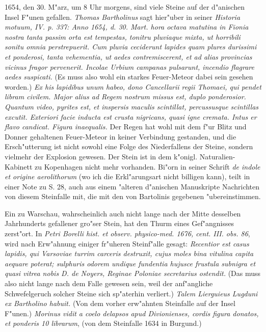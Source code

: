\documentclass[a4paper, 11pt, oneside, polutonikogreek, german]{article}
\begin{document}
1654, den 30. M"arz, um 8 Uhr morgens, sind viele Steine auf der d"anischen Insel F"unen gefallen. \emph{Thomas Bartholinus} sagt hier"uber in seiner \emph{Historia motuum, IV. p. 337: Anno 1654, d. 30. Mart. hora octava matutina in Fionia nostra tanta passim orta est tempestas, tonitru pluviaque mixta, ut horribili sonitu omnia perstrepuerit. Cum pluvia ceciderunt lapides quam plures durissimi et ponderosi, tanta vehementia, ut aedes contremiscerent, et ad alias provincias vicinus fragor pervenerit. Incolae Urbium campanas pulsarunt, incendio flagrare aedes suspicati.} (Es muss also wohl ein starkes Feuer-Meteor dabei sein gesehen worden.) \emph{Ex his lapidibus unum habeo, dono Cancellarii regii Thomaei, qui pendet libram civilem. Major alius ad Regem nostrum missus est, duplo ponderosior. Quantum video, pyrites est, et inspersis maculis scintillat, percussusque scintillas excutit. Exteriori facie inducta est crusta nigricans, quasi igne cremata. Intus er flavo candicat. Figura inaequalis.} Der Regen hat wohl mit dem f"ur Blitz und Donner gehaltenen Feuer-Meteor in keiner Verbindung gestanden, und die Ersch"utterung ist nicht sowohl eine Folge des Niederfallens der Steine, sondern vielmehr der Explosion gewesen. Der Stein ist in dem k"onigl. Naturalien-Kabinett zu Kopenhagen nicht mehr vorhanden. Bi"orn in seiner Schrift \emph{de indole et origine aerolithorum} (wo ich die Erkl"arungsart nicht billigen kann), teilt in einer Note zu S. 28, auch aus einem "alteren d"anischen Manuskripte Nachrichten von diesem Steinfalle mit, die mit den von Bartolinis gegebenen "ubereinstimmen.

Ein zu Warschau, wahrscheinlich auch nicht lange nach der Mitte desselben Jahrhunderts gefallener gro"ser Stein, hat den Thurm eines Gef"angnisses zerst"ort. In \emph{Petri Borelli hist. et observ. physico-med. 1676, cent. III. obs. 86}, wird nach Erw"ahnung einiger fr"uheren Steinf"alle gesagt: \emph{Recentior est casus lapidis, qui Varsoviae turrim carceris destruxit, cujus moles bina vitulina capita aequare poterat; sulphuris odorem undique fundentia hujusce frustula subnigra et quasi vitrea nobis D. de Noyers, Reginae Poloniae secretarius ostendit.} (Das muss also nicht lange nach dem Falle gewesen sein, weil der anf"angliche Schwefelgeruch solcher Steine sich sp"aterhin verliert.) \emph{Talem Lierguieus Lugduni ex Bartholino habuit.} (Von dem vorher erw"ahnten Steinfalle auf der Insel F"unen.) \emph{Morinus vidit a coelo delapsos apud Divionienses, cordis figura donatos, et ponderis 10 librarum}, (von dem Steinfalle 1634 in Burgund.)
\end{document}
